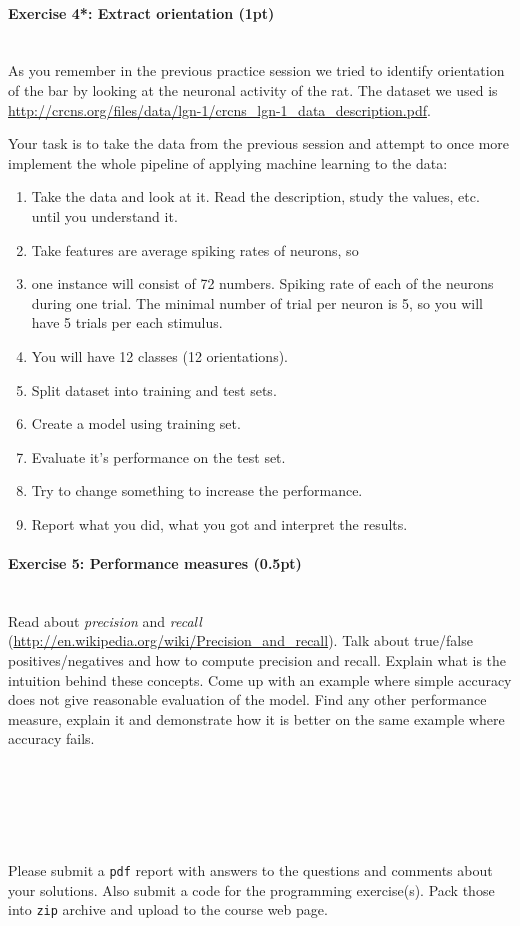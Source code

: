 \documentclass[a4paper,11pt]{article}
\newenvironment{exercise}[3]{\paragraph{Exercise #1: #2 (#3pt)}\ \\}{
\medskip}
\begin{document}
\begin{exercise}{4*}{Extract orientation}{1}
As you remember in the previous practice session we tried to identify orientation of the bar by looking at the neuronal activity of the rat. The dataset we used is \url{http://crcns.org/files/data/lgn-1/crcns_lgn-1_data_description.pdf}.

Your task is to take the data from the previous session and attempt to once more implement the whole pipeline of applying machine learning to the data:
\begin{enumerate}
\itemsep 0em
	\item Take the data and look at it. Read the description, study the values, etc. until you understand it.
	\item Take features are average spiking rates of neurons, so
	\item one instance will consist of 72 numbers. Spiking rate of each of the neurons during one trial. The minimal number of trial per neuron is 5, so you will have 5 trials per each stimulus.
	\item You will have 12 classes (12 orientations).
	\item Split dataset into training and test sets.
	\item Create a model using training set.
	\item Evaluate it's performance on the test set.
	\item Try to change something to increase the performance.
	\item Report what you did, what you got and interpret the results.
\end{enumerate}
\end{exercise}


\begin{exercise}{5}{Performance measures}{0.5}
Read about \emph{precision} and \emph{recall} (\url{http://en.wikipedia.org/wiki/Precision_and_recall}). Talk about true/false positives/negatives and how to compute precision and recall. Explain what is the intuition behind these concepts. Come up with an example where simple accuracy does not give reasonable evaluation of the model. Find any other performance measure, explain it and demonstrate how it is better on the same example where accuracy fails.
\end{exercise}
\ \\
\ \\
\ \\
\ \\
\ \\
Please submit a \texttt{pdf} report with answers to the questions and comments about your solutions. Also submit a code for the programming exercise(s). Pack those into \texttt{zip} archive and upload to the course web page.
\end{document}
